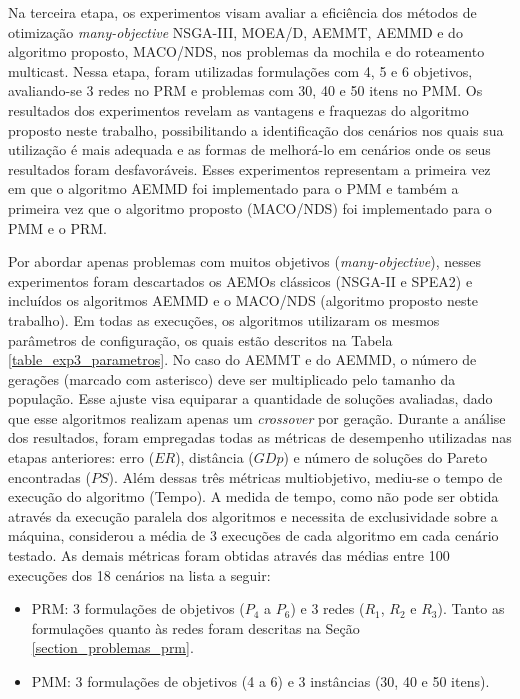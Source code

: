 Na terceira etapa, os experimentos visam avaliar a eficiência dos métodos de otimização \textit{many-objective} NSGA-III, MOEA/D, AEMMT, AEMMD e do algoritmo proposto, MACO/NDS, nos problemas da mochila e do roteamento multicast. Nessa etapa, foram utilizadas formulações com 4, 5 e 6 objetivos, avaliando-se 3 redes no PRM e problemas com 30, 40 e 50 itens no PMM. Os resultados dos experimentos revelam as vantagens e fraquezas do algoritmo proposto neste trabalho, possibilitando a identificação dos cenários nos quais sua utilização é mais adequada e as formas de melhorá-lo em cenários onde os seus resultados foram desfavoráveis. Esses experimentos representam a primeira vez em que o algoritmo AEMMD foi implementado para o PMM e também a primeira vez que o algoritmo proposto (MACO/NDS) foi implementado para o PMM e o PRM.

Por abordar apenas problemas com muitos objetivos (\textit{many-objective}), nesses experimentos foram descartados os AEMOs clássicos (NSGA-II e SPEA2) e incluídos os algoritmos AEMMD e o MACO/NDS (algoritmo proposto neste trabalho). Em todas as execuções, os algoritmos utilizaram os mesmos parâmetros de configuração, os quais estão descritos na Tabela \ref{table_exp3_parametros}. No caso do AEMMT e do AEMMD, o número de gerações (marcado com asterisco) deve ser multiplicado pelo tamanho da população. Esse ajuste visa equiparar a quantidade de soluções avaliadas, dado que esse algoritmos realizam apenas um \textit{crossover} por geração. Durante a análise dos resultados, foram empregadas todas as métricas de desempenho utilizadas nas etapas anteriores: erro ($ER$),  distância ($GDp$) e número de soluções do Pareto encontradas ($PS$). Além dessas três métricas multiobjetivo, mediu-se o tempo de execução do algoritmo (Tempo). A medida de tempo, como não pode ser obtida através da execução paralela dos algoritmos e necessita de exclusividade sobre a máquina, considerou a média de 3 execuções de cada algoritmo em cada cenário testado. As demais métricas foram obtidas através das médias entre 100 execuções dos 18 cenários na lista a seguir:

\begin{itemize}
	\item PRM: 3 formulações de objetivos ($P_4$ a $P_6$) e 3 redes ($R_1$, $R_2$ e $R_3$). Tanto as formulações quanto às redes foram descritas na Seção \ref{section_problemas_prm}.
	\item PMM: 3 formulações de objetivos (4 a 6) e 3 instâncias (30, 40 e 50 itens).
\end{itemize}

